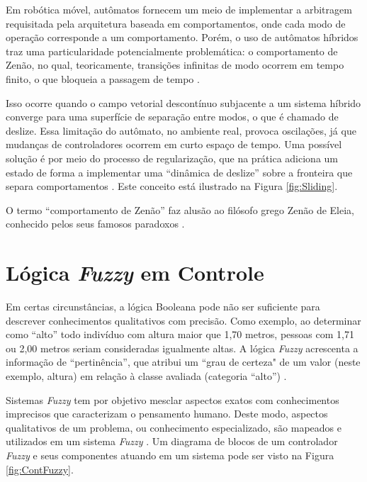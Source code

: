 Em robótica móvel, autômatos fornecem um meio de implementar a arbitragem
requisitada pela arquitetura baseada em comportamentos, onde cada modo de
operação corresponde a um comportamento. Porém, o uso de autômatos híbridos
traz uma particularidade potencialmente problemática: o comportamento de
Zenão, no qual, teoricamente, transições infinitas de modo ocorrem em tempo finito, o que
bloqueia a passagem de tempo \cite{art:Magnus_Behavior}.

Isso ocorre quando o campo vetorial descontínuo subjacente a um sistema híbrido
converge para uma superfície de separação entre modos, o que é chamado de
deslize. Essa limitação do autômato, no ambiente real, provoca oscilações, já
que mudanças de controladores ocorrem em curto espaço de tempo. Uma possível
solução é por meio do processo de regularização, que na prática adiciona um
estado de forma a implementar uma ``dinâmica de deslize'' sobre a fronteira que
separa comportamentos \cite{art:Magnus_Behavior}. Este conceito está ilustrado
na Figura \ref{fig:Sliding}.



O termo ``comportamento de Zenão'' faz alusão ao filósofo grego Zenão de
Eleia, conhecido pelos seus famosos paradoxos \cite{art:Magnus_Behavior}. 

\section{Lógica \textit{Fuzzy} em Controle}

Em certas circunstâncias, a lógica Booleana pode não ser suficiente
para descrever conhecimentos qualitativos com precisão. Como exemplo, ao
determinar como ``alto'' todo indivíduo com altura maior que 1,70 metros,
pessoas com 1,71 ou 2,00 metros seriam consideradas igualmente altas.
A lógica \textit{Fuzzy} acrescenta a informação de ``pertinência'', que atribui um
``grau de certeza" de um valor (neste exemplo, altura) em relação à classe
avaliada (categoria ``alto'') \cite{fuzzylilly}.

Sistemas \textit{Fuzzy} tem por objetivo mesclar aspectos exatos com
conhecimentos imprecisos que caracterizam o pensamento humano. Deste modo,
aspectos qualitativos de um problema, ou conhecimento especializado, são
mapeados e utilizados em um sistema \textit{Fuzzy} \cite{fuzzylilly}. Um
diagrama de blocos de um controlador \textit{Fuzzy} e seus componentes atuando
em um sistema pode ser visto na Figura \ref{fig:ContFuzzy}.

